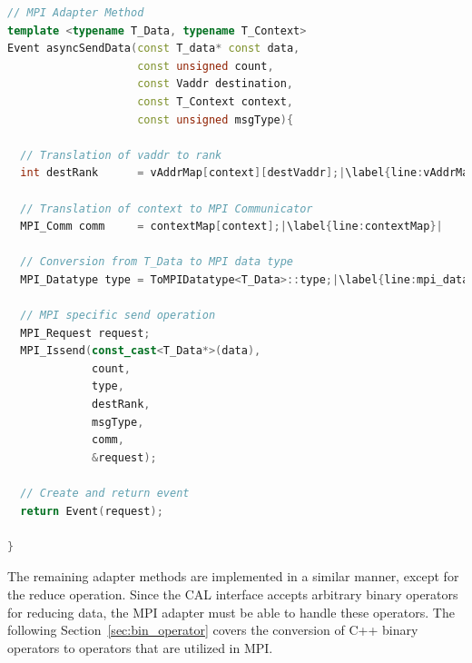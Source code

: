 \begin{minipage}[t]{\textwidth} 
\begin{lstlisting}[language=C++, breaklines=false, caption={Communication method for non-blocking sending of data within the MPI adapter class. The virtual address of the destination is translated to its MPI rank. The context is translated to an MPI communicator and the template data type \cpp{T\_Data} is translated to an MPI data type. The communication operation is finally performed by MPI.}, label={lst:adapter_send}, escapechar=|]
// MPI Adapter Method
template <typename T_Data, typename T_Context>      
Event asyncSendData(const T_data* const data, 
                    const unsigned count, 
                    const Vaddr destination, 
                    const T_Context context, 
                    const unsigned msgType){    

  // Translation of vaddr to rank
  int destRank      = vAddrMap[context][destVaddr];|\label{line:vAddrMap}|

  // Translation of context to MPI Communicator
  MPI_Comm comm     = contextMap[context];|\label{line:contextMap}|

  // Conversion from T_Data to MPI data type
  MPI_Datatype type = ToMPIDatatype<T_Data>::type;|\label{line:mpi_datatype}|

  // MPI specific send operation                                                                            
  MPI_Request request; 
  MPI_Issend(const_cast<T_Data*>(data), 
             count, 
             type,
             destRank, 
             msgType,
             comm,
             &request);

  // Create and return event
  return Event(request);                                                                                                       

}  
\end{lstlisting}
\end{minipage}

\noindent The remaining adapter methods are implemented in a similar
manner, except for the reduce operation. Since the CAL interface
accepts arbitrary binary operators for reducing data, the MPI adapter
must be able to handle these
operators. The following Section~\ref{sec:bin_operator} covers the conversion of C++
binary operators to operators that are utilized in MPI.

